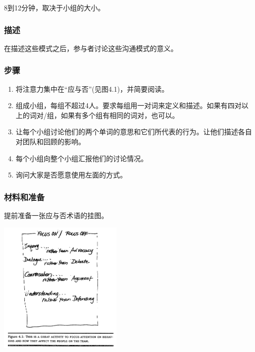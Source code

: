 8到12分钟，取决于小组的大小。

\hypertarget{ux63cfux8ff0}{%
\subsubsection{描述}\label{ux63cfux8ff0}}

在描述这些模式之后，参与者讨论这些沟通模式的意义。

\hypertarget{ux6b65ux9aa4}{%
\subsubsection{步骤}\label{ux6b65ux9aa4}}

\begin{enumerate}
\tightlist
\item
  将注意力集中在``应与否''(见图4.1)，并简要阅读。
\item
  组成小组，每组不超过4人。要求每组用一对词来定义和描述。如果有四对以上的词对/组，如果有多个组有相同的词对，也可以。
\item
  让每个小组讨论他们的两个单词的意思和它们所代表的行为。让他们描述各自对团队和回顾的影响。
\item
  每个小组向整个小组汇报他们的讨论情况。
\item
  询问大家是否愿意使用左面的方式。
\end{enumerate}

\hypertarget{ux6750ux6599ux548cux51c6ux5907}{%
\subsubsection{材料和准备}\label{ux6750ux6599ux548cux51c6ux5907}}

提前准备一张应与否术语的挂图。


\includegraphics[width=6cm]{derby_41.png}

